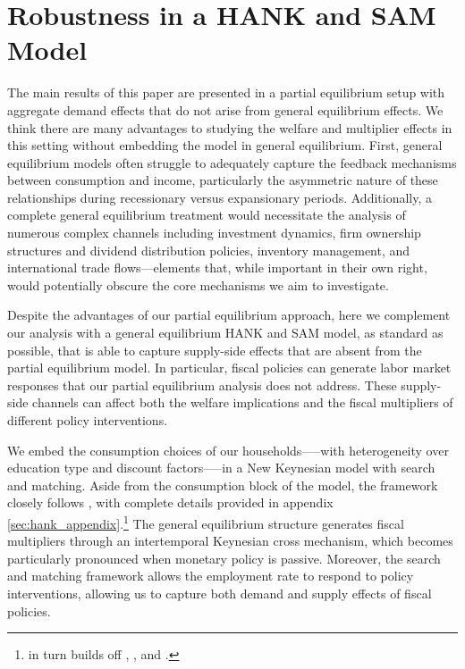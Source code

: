 \documentclass[\econtexRoot/HAFiscal]{subfiles}
\begin{document}
	
\FloatBarrier
\hypertarget{hank}{}\par\section{Robustness in a HANK and SAM Model}
\notinsubfile{\label{sec:hank}}


The main results of this paper are presented in a partial equilibrium setup with aggregate demand effects that do not arise from general equilibrium effects. We think there are many advantages to studying the welfare and multiplier effects in this setting without embedding the model in general equilibrium.  First, general equilibrium models often struggle to adequately capture the feedback mechanisms between consumption and income, particularly the asymmetric nature of these relationships during recessionary versus expansionary periods. Additionally, a complete general equilibrium treatment would necessitate the analysis of numerous complex channels including investment dynamics, firm ownership structures and dividend distribution policies, inventory management, and international trade flows—elements that, while important in their own right, would potentially obscure the core mechanisms we aim to investigate.

Despite the advantages of our partial equilibrium approach, here we complement our analysis with a general equilibrium HANK and SAM model, as standard as possible, that is able to capture supply-side effects that are absent from the partial equilibrium model. In particular, fiscal policies can generate labor market responses that our partial equilibrium analysis does not address. These supply-side channels can affect both the welfare implications and the fiscal multipliers of different policy interventions. 

We embed the consumption choices of our households—--with heterogeneity over education type and discount factors—--in a New Keynesian model with search and matching. Aside from the consumption block of the model, the framework closely follows \cite{Du2024}, with complete details provided in appendix \ref{sec:hank_appendix}.\footnote{\cite{Du2024} in turn builds off \cite{Gornemann2021}, \cite{Auclert2020}, and \cite{Ravn2017}.} The general equilibrium structure generates fiscal multipliers through an intertemporal Keynesian cross mechanism, which becomes particularly pronounced when monetary policy is passive. Moreover, the search and matching framework allows the employment rate to respond to policy interventions, allowing us to capture both demand and supply effects of fiscal policies.
\end{document}
